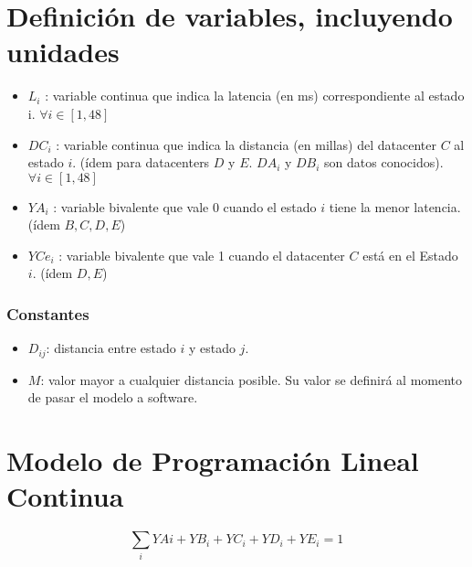 \documentclass{article}
\begin{document}
\part{Definici\'on de variables, incluyendo unidades}
\begin{itemize}
	\item $L_{i}$ : variable continua que indica la latencia (en ms) correspondiente al estado i. $\forall i \in [1, 48]$
	\item $DC_{i}$ : variable continua que indica la distancia (en millas) del datacenter $C$ al estado $i$. (\'idem para datacenters $D$ y $E$. $DA_{i}$ y  $DB_{i}$ son datos conocidos). $\forall i \in [1, 48]$
	\item $YA_{i}$ : variable bivalente que vale 0 cuando el estado $i$ tiene la menor latencia. (\'idem $B,C,D,E$)
	\item $YCe_{i}$ : variable bivalente que vale 1 cuando el datacenter $C$ est\'a en el Estado $i$. (\'idem $D, E$)
\end{itemize}
\section*{Constantes}
\begin{itemize}
\item $D_{ij}$: distancia entre estado $i$ y estado $j$.
\item $M$: valor mayor a cualquier distancia posible. Su valor se definir\'a al momento de pasar el modelo a software.
\end{itemize}

\part{Modelo de Programaci\'on Lineal Continua}

\begin{equation}
	\sum_{i} YA{i} + YB_{i} + YC_i + YD_i + YE_i = 1
\end{equation}
\end{document}
